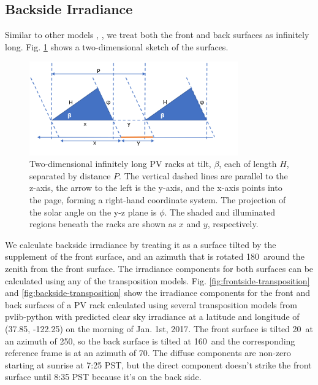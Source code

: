 \documentclass[conference]{IEEEtran}
\begin{document}
\subsection{ Backside Irradiance }
Similar to other models \cite{Marion2017}, \cite{Anoma2017}, we treat both the front and back surfaces as infinitely long. Fig. \ref{fig:2d-infinite-sheds} shows a two-dimensional sketch of the surfaces.

\begin{figure}
\centering
\includegraphics[width=9cm]{2d_infinite_sheds.png}
\caption{Two-dimensional infinitely long PV racks at tilt, $\beta$, each of length $H$, separated by distance $P$.  The vertical dashed lines are parallel to the z-axis, the arrow to the left is the y-axis, and the x-axis points into the page, forming a right-hand coordinate system.  The projection of the solar angle on the y-z plane is $\phi$. The shaded and illuminated regions beneath the racks are shown as $x$ and $y$, respectively.}
\label{fig:2d-infinite-sheds}
\end{figure}

We calculate backside irradiance by treating it as a surface tilted by the supplement of the front surface, and an azimuth that is rotated 180\degree\ around the zenith from the front surface.  The irradiance components for both surfaces can be calculated using any of the transposition models.  Fig. \ref{fig:frontside-transposition} and \ref{fig:backside-transposition} show the irradiance components for the front and back surfaces of a PV rack calculated using several transposition models from pvlib-python \cite{Holmgren2018} with predicted clear sky irradiance at a latitude and longitude of (37.85\degree, -122.25\degree) on the morning of Jan. 1st, 2017.  The front surface is tilted 20\degree\ at an azimuth of 250\degree, so the back surface is tilted at 160\degree\ and the corresponding reference frame is at an azimuth of 70\degree.  The diffuse components are non-zero starting at sunrise at 7:25 PST, but the direct component doesn't strike the front surface until 8:35 PST because it's on the back side.
\end{document}

